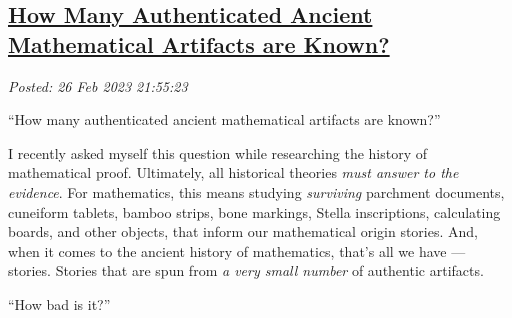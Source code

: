 %

%
%
%

\subsection*{\href{https://analyzethedatanotthedrivel.org/2023/02/26/how-many-authenticated-ancient-mathematical-artifacts-are-known/}{How Many Authenticated Ancient Mathematical Artifacts are Known?}}


\noindent\emph{Posted: 26 Feb 2023 21:55:23}
\vspace{6pt}

``How many authenticated ancient mathematical artifacts are known?''

I recently asked myself this question while researching the history of
mathematical proof. Ultimately, all historical theories \emph{must
answer to the evidence}. For mathematics, this means studying
\emph{surviving} parchment documents, cuneiform tablets, bamboo strips,
bone markings, Stella inscriptions, calculating boards, and other
objects, that inform our mathematical origin stories. And, when it comes
to the ancient history of mathematics, that's all we have --- stories.
Stories that are spun from \emph{a very small number} of authentic
artifacts.

``How bad is it?''


